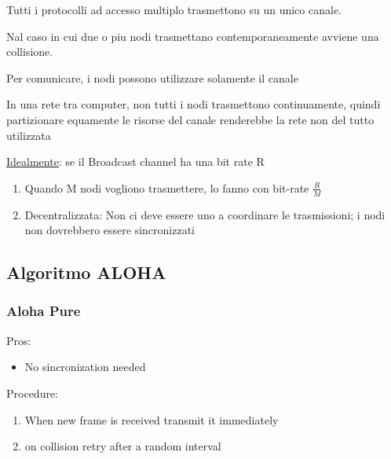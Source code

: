 \documentclass{article}
\begin{document}
Tutti i protocolli ad accesso multiplo trasmettono su un unico canale.

Nal caso in cui due o piu nodi trasmettano contemporaneamente avviene una collisione.

Per comunicare, i nodi possono utilizzare solamente il canale

In una rete tra computer, non tutti i nodi trasmettono continuamente, quindi partizionare equamente le risorse del canale renderebbe la rete non del tutto utilizzata

\underline{Idealmente}: se il Broadcast channel ha una bit rate R
\begin{enumerate}
    \item Quando M nodi vogliono trasmettere, lo fanno con bit-rate \(\frac{R}{M}\)
    \item Decentralizzata: Non ci deve essere uno a coordinare le trasmissioni; i nodi non dovrebbero essere sincronizzati
\end{enumerate}

\subsection{Algoritmo ALOHA}

\subsubsection{Aloha Pure}
Pros:
\begin{itemize}
    \item No sincronization needed
\end{itemize}
Procedure:

\begin{enumerate}
    \item When new frame is received transmit it immediately
    \item on collision retry after a random interval
\end{enumerate}
\end{document}
